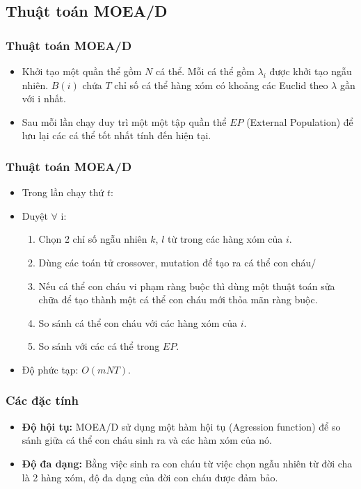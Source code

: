\documentclass{beamer}
\begin{document}

\subsection{\textbf{Thuật toán MOEA/D}}

    \begin{frame}
    \frametitle{\textbf{Thuật toán MOEA/D}}
        \begin{itemize} 
            \item<1-> Khởi tạo một quần thể gồm $ N $ cá thể. Mỗi cá thể gồm $ \lambda_{i} $ được khởi tạo ngẫu nhiên.
                    $ B(i) $ chứa $ T $ chỉ số cá thể hàng xóm có khoảng các Euclid theo $ \lambda $ gần với i nhất.
            \item<2-> Sau mỗi lần chạy duy trì một một tập quần thể $ EP $ (External Population) để lưu
                    lại các cá thể tốt nhất tính đến hiện tại.
        \end{itemize}
    \end{frame}

    \begin{frame}
    \frametitle{\textbf{Thuật toán MOEA/D}} 
        \begin{itemize}
            \item<1-> Trong lần chạy thứ $ t $:
            \item<2-> Duyệt $ \forall $ i:
            \begin{enumerate}
                \item<2-> Chọn 2 chỉ số ngẫu nhiên $ k $, $ l $ từ trong các hàng xóm của $ i $.
                \item<2-> Dùng các toán tử crossover, mutation để tạo ra cá thể con cháu/
                \item<2-> Nếu cá thể con cháu vi phạm ràng buộc thì dùng một thuật toán sửa chữa để tạo thành một
                cá thể con cháu mới thỏa mãn ràng buộc.
                \item<3-> So sánh cá thể con cháu với các hàng xóm của $ i $. 
                \item<3-> So sánh với các cá thể trong $ EP $.
            \end{enumerate}
            \item<4-> Độ phức tạp: $ O(mNT) $.
        \end{itemize}
    \end{frame}

    \begin{frame}
    \frametitle{\textbf{Các đặc tính}}
        \begin{itemize}
            \item<1-> \textbf{Độ hội tụ:} MOEA/D sử dụng một hàm hội tụ (Agression function)
            để so sánh giữa cá thể con cháu sinh ra và các hàm xóm của nó.
            \item<2-> \textbf{Độ đa dạng:} Bằng việc sinh ra con cháu từ việc chọn ngẫu
            nhiên từ đời cha là 2 hàng xóm, độ đa dạng của đời con cháu được đảm bảo.
        \end{itemize}
    \end{frame}
\end{document}
